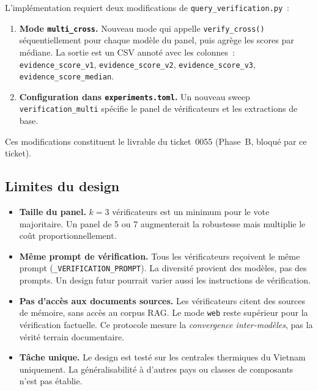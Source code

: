 L'impl\'ementation requiert deux modifications de \texttt{query\_verification.py}~:

\begin{enumerate}
\item \textbf{Mode \texttt{multi\_cross}.} Nouveau mode qui appelle
  \texttt{verify\_cross()} s\'equentiellement pour chaque mod\`ele du panel, puis
  agr\`ege les scores par m\'ediane. La sortie est un CSV annot\'e avec les
  colonnes~: \texttt{evidence\_score\_v1}, \texttt{evidence\_score\_v2},
  \texttt{evidence\_score\_v3}, \texttt{evidence\_score\_median}.

\item \textbf{Configuration dans \texttt{experiments.toml}.} Un nouveau sweep
  \texttt{verification\_multi} sp\'ecifie le panel de v\'erificateurs et les
  extractions de base.
\end{enumerate}

\noindent Ces modifications constituent le livrable du ticket~0055 (Phase~B,
bloqu\'e par ce ticket).

\subsection{Limites du design}\label{sec:multi-verif-limits}

\begin{itemize}
\item \textbf{Taille du panel.} $k=3$ v\'erificateurs est un minimum pour le
  vote majoritaire. Un panel de 5 ou 7 augmenterait la robustesse mais
  multiplie le co\^ut proportionnellement.

\item \textbf{M\^eme prompt de v\'erification.} Tous les v\'erificateurs re\c{c}oivent
  le m\^eme prompt (\texttt{\_VERIFICATION\_PROMPT}). La diversit\'e provient des
  mod\`eles, pas des prompts. Un design futur pourrait varier aussi les
  instructions de v\'erification.

\item \textbf{Pas d'acc\`es aux documents sources.} Les v\'erificateurs citent des
  sources de m\'emoire, sans acc\`es au corpus RAG. Le mode \texttt{web} reste
  sup\'erieur pour la v\'erification factuelle. Ce protocole mesure la
  \emph{convergence inter-mod\`eles}, pas la v\'erit\'e terrain documentaire.

\item \textbf{T\^ache unique.} Le design est test\'e sur les centrales thermiques
  du Vietnam uniquement. La g\'en\'eralisabilit\'e \`a d'autres pays ou classes
  de composants n'est pas \'etablie.
\end{itemize}

